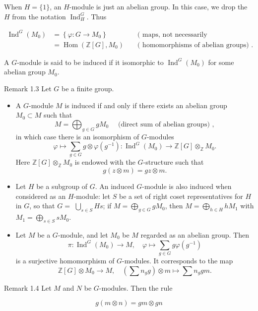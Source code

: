 \documentclass[10pt]{article}
\begin{document}
When $H=\{1\}$, an $H$-module is just an abelian group. In this case, we drop the $H$ from the notation $\operatorname{Ind}_{H}^{G}$. Thus

$$
\begin{aligned}
\operatorname{Ind}^{G}\left(M_{0}\right) & =\left\{\varphi: G \rightarrow M_{0}\right\} & & \text { ( maps, not necessarily homomorphisms) } \\
& =\operatorname{Hom}\left(\mathbb{Z}[G], M_{0}\right) & & \text { ( homomorphisms of abelian groups) } .
\end{aligned}
$$

A $G$-module is said to be induced if it isomorphic to $\operatorname{Ind}^{G}\left(M_{0}\right)$ for some abelian group $M_{0}$.

Remark 1.3 Let $G$ be a finite group.

\begin{itemize}
  \item[(a)] A $G$-module $M$ is induced if and only if there exists an abelian group $M_{0} \subset M$ such that
$$
M=\bigoplus_{g \in G} g M_{0} \quad \text { (direct sum of abelian groups) },
$$
in which case there is an isomorphism of $G$-modules
$$
\varphi \mapsto \sum_{g \in G} g \otimes \varphi\left(g^{-1}\right): \operatorname{Ind}^{G}\left(M_{0}\right) \rightarrow \mathbb{Z}[G] \otimes_{\mathbb{Z}} M_{0} .
$$
Here $\mathbb{Z}[G] \otimes_{\mathbb{Z}} M_{0}$ is endowed with the $G$-structure such that
$$
g(z \otimes m)=g z \otimes m .
$$
  \item[(b)] Let $H$ be a subgroup of $G$. An induced $G$-module is also induced when considered as an $H$-module: let $S$ be a set of right coset representatives for $H$ in $G$, so that $G=$ $\bigcup_{s \in S} H s$; if $M=\bigoplus_{g \in G} g M_{0}$, then $M=\bigoplus_{h \in H} h M_{1}$ with $M_{1}=\bigoplus_{s \in S} s M_{0}$.
  \item[(c)] Let $M$ be a $G$-module, and let $M_{0}$ be $M$ regarded as an abelian group. Then
$$
\pi: \operatorname{Ind}^{G}\left(M_{0}\right) \rightarrow M, \quad \varphi \mapsto \sum_{g \in G} g \varphi\left(g^{-1}\right)
$$
is a surjective homomorphism of $G$-modules. It corresponds to the map
$$
\mathbb{Z}[G] \otimes M_{0} \rightarrow M, \quad\left(\sum n_{g} g\right) \otimes m \mapsto \sum n_{g} g m .
$$
\end{itemize}

Remark 1.4 Let $M$ and $N$ be $G$-modules. Then the rule

$$
g(m \otimes n)=g m \otimes g n
$$
\end{document}
